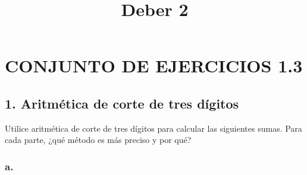 \documentclass[
  letterpaper,
  DIV=11,
  numbers=noendperiod]{scrartcl}
\title{Deber 2}
\author{}
\date{}
\begin{document}
\maketitle


\section{CONJUNTO DE EJERCICIOS 1.3}\label{conjunto-de-ejercicios-1.3}

\subsection{1. Aritmética de corte de tres
dígitos}\label{aritmuxe9tica-de-corte-de-tres-duxedgitos}

Utilice aritmética de corte de tres dígitos para calcular las siguientes
sumas. Para cada parte, ¿qué método es más preciso y por qué?

\subsubsection{a.}\label{a.}
\end{document}
